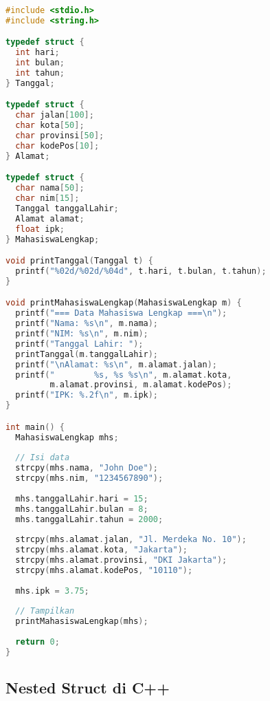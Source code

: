 \documentclass[../main.tex]{subfiles}
\begin{document}
\begin{lstlisting}[language=C, caption={Nested struct di C}]
#include <stdio.h>
#include <string.h>

typedef struct {
  int hari;
  int bulan;
  int tahun;
} Tanggal;

typedef struct {
  char jalan[100];
  char kota[50];
  char provinsi[50];
  char kodePos[10];
} Alamat;

typedef struct {
  char nama[50];
  char nim[15];
  Tanggal tanggalLahir;
  Alamat alamat;
  float ipk;
} MahasiswaLengkap;

void printTanggal(Tanggal t) {
  printf("%02d/%02d/%04d", t.hari, t.bulan, t.tahun);
}

void printMahasiswaLengkap(MahasiswaLengkap m) {
  printf("=== Data Mahasiswa Lengkap ===\n");
  printf("Nama: %s\n", m.nama);
  printf("NIM: %s\n", m.nim);
  printf("Tanggal Lahir: ");
  printTanggal(m.tanggalLahir);
  printf("\nAlamat: %s\n", m.alamat.jalan);
  printf("        %s, %s %s\n", m.alamat.kota, 
         m.alamat.provinsi, m.alamat.kodePos);
  printf("IPK: %.2f\n", m.ipk);
}

int main() {
  MahasiswaLengkap mhs;
  
  // Isi data
  strcpy(mhs.nama, "John Doe");
  strcpy(mhs.nim, "1234567890");
  
  mhs.tanggalLahir.hari = 15;
  mhs.tanggalLahir.bulan = 8;
  mhs.tanggalLahir.tahun = 2000;
  
  strcpy(mhs.alamat.jalan, "Jl. Merdeka No. 10");
  strcpy(mhs.alamat.kota, "Jakarta");
  strcpy(mhs.alamat.provinsi, "DKI Jakarta");
  strcpy(mhs.alamat.kodePos, "10110");
  
  mhs.ipk = 3.75;
  
  // Tampilkan
  printMahasiswaLengkap(mhs);
  
  return 0;
}
\end{lstlisting}

\subsection{Nested Struct di C++}
\end{document}
